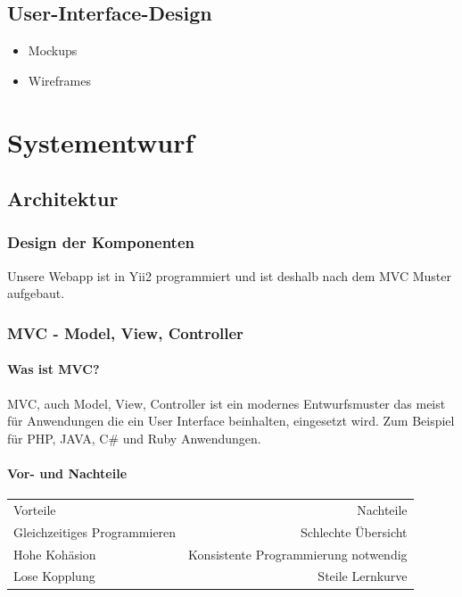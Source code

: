 \section{User-Interface-Design}
\begin{itemize}
	\item Mockups
	\item Wireframes
\end{itemize}


\chapter{Systementwurf}

\section{Architektur}
\def \currentAuthor{Florian Tipotsch}
\subsection{Design der Komponenten}

Unsere Webapp ist in Yii2 programmiert und ist deshalb nach dem MVC Muster aufgebaut.
\subsection{MVC - Model, View, Controller}\label{sec:MVC}

\subsubsection{Was ist MVC?} 
MVC, auch Model, View, Controller ist ein modernes Entwurfsmuster das meist für Anwendungen die ein User Interface beinhalten, eingesetzt wird. Zum Beispiel für PHP, JAVA, C\# und Ruby Anwendungen. \cite{MVC}

\subsubsection{Vor- und Nachteile}
\begin{tabular}{ l r }
	Vorteile & Nachteile \\
	Gleichzeitiges Programmieren & Schlechte Übersicht \\
	Hohe Kohäsion \cite{kohaesion} & Konsistente Programmierung notwendig\\
	Lose Kopplung \cite{kopplung} & Steile Lernkurve \\	
\end{tabular}

